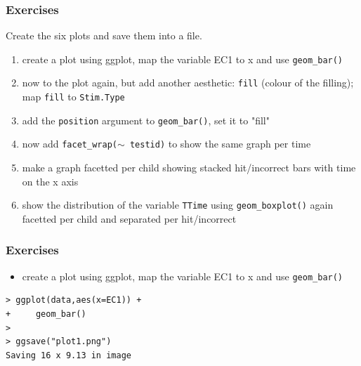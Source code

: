 \documentclass[xcolor={table},c]{beamer}
\begin{document}
\begin{frame}[fragile]\frametitle{Exercises}
Create the six plots and save them into a file.
  \begin{enumerate}
  \item create a plot using ggplot, map the variable EC1 to x and use \texttt{geom\_bar()}
  \item now to the plot again, but add another aesthetic: \texttt{fill} (colour of the filling); map \texttt{fill} to \texttt{Stim.Type}
  \item add the \texttt{position} argument to \texttt{geom\_bar()}, set it to "fill"
  \item now add \texttt{facet\_wrap($\sim$ testid)} to show the same graph per time
  \item make a graph facetted per child showing stacked hit/incorrect bars with time on the x axis
  \item show the distribution of the variable \texttt{TTime} using \texttt{geom\_boxplot()} again facetted per child and separated per hit/incorrect
  \end{enumerate}
\end{frame}


\begin{frame}[fragile]\frametitle{Exercises}
  \begin{itemize}
  \item create a plot using ggplot, map the variable EC1 to x and use \texttt{geom\_bar()}
  \end{itemize}
\begin{verbatim}
> ggplot(data,aes(x=EC1)) +
+     geom_bar()
> 
> ggsave("plot1.png")
Saving 16 x 9.13 in image  
\end{verbatim}
\begin{center}
\end{center}
\end{frame}
\end{document}
